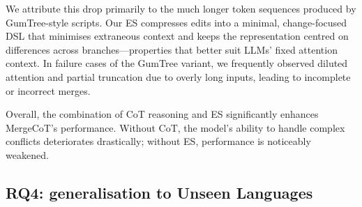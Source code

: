 \documentclass[sigconf,review,anonymous]{acmart}
\begin{document}
We attribute this drop primarily to the much longer token sequences produced by GumTree-style scripts. Our ES compresses edits into a minimal, change-focused DSL that minimises extraneous context and keeps the representation centred on differences across branches—properties that better suit LLMs’ fixed attention context. In failure cases of the GumTree variant, we frequently observed diluted attention and partial truncation due to overly long inputs, leading to incomplete or incorrect merges.

Overall, the combination of CoT reasoning and ES significantly enhances MergeCoT’s performance. Without CoT, the model's ability to handle complex conflicts deteriorates drastically; without ES, performance is noticeably weakened.

\subsection{RQ4: generalisation to Unseen Languages}
\end{document}
